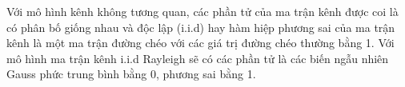Với mô hình kênh không tương quan, các phần tử của ma trận kênh được coi là có phân bố giống nhau và độc lập (i.i.d) hay hàm hiệp phương sai của ma trận kênh là một ma trận đường chéo với các giá trị đường chéo thường bằng 1. Với mô hình ma trận kênh i.i.d Rayleigh sẽ có các phần tử là các biến ngẫu nhiên Gauss phức trung bình bằng 0, phương sai bằng 1.





